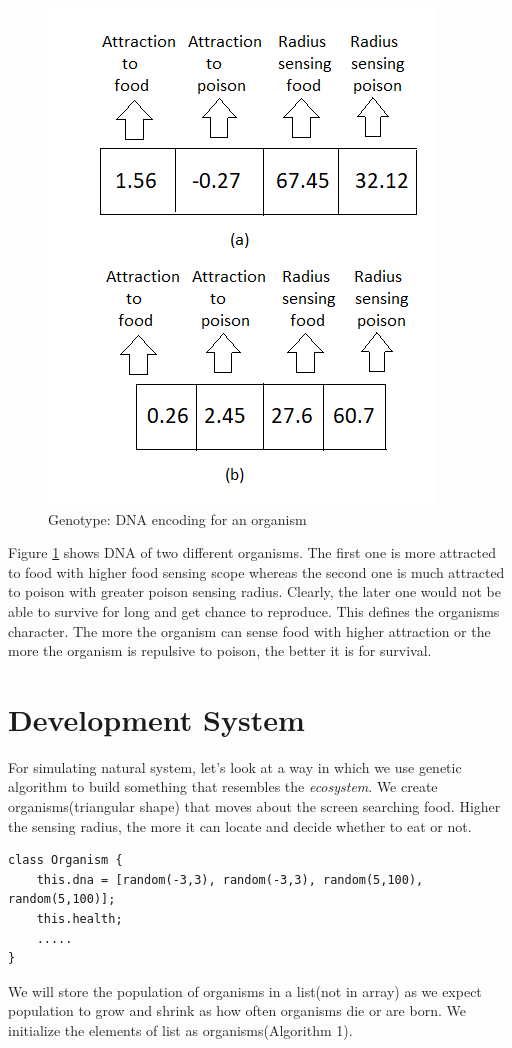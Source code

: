 \documentclass[conference]{IEEEtran}
\begin{document}
\begin{figure}
	\includegraphics[scale=1]{genotype.png}
	\caption{Genotype: DNA encoding for an organism}
	\label{fig:genotype}
\end{figure}
Figure \ref{fig:genotype} shows DNA of two different organisms. The first one is more attracted to food with higher food sensing scope whereas the second one is much attracted to poison with greater poison sensing radius. Clearly, the later one would not be able to survive for long and get chance to reproduce. This defines the organisms character. The more the organism can sense food with higher attraction or the more the organism is repulsive to poison, the better it is for survival.

\section{Development System}
For simulating natural system, let's look at a way in which we use genetic algorithm to build something that resembles the \textit{ecosystem}. We create organisms(triangular shape) that moves about the screen searching food. Higher the sensing radius, the more it can locate and decide whether to eat or not.

\begin{lstlisting}[caption = DNA of Organism]
class Organism {
	this.dna = [random(-3,3), random(-3,3), random(5,100), random(5,100)];
	this.health;
	.....
}
\end{lstlisting}
We will store the population of organisms in a list(not in array) as we expect population to grow and shrink as how often organisms die or are born. We initialize the elements of list as organisms(Algorithm 1).
\end{document}
